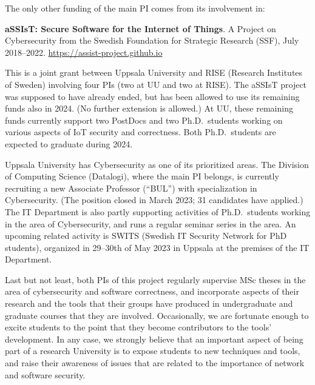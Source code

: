 \documentclass[11pt]{article}
\newcommand{\myparagraph}{}
\let\myparagraph=\paragraph
\renewcommand{\paragraph}{\vspace{-3mm}\myparagraph}
\begin{document}
\noindent
The only other funding of the main PI comes from its involvement in:
\vspace*{-.5em}
\begin{quoting}
  \textbf{aSSIsT: Secure Software for the Internet of Things}.
  A Project on Cybersecurity from the Swedish Foundation for Strategic
  Research (SSF), July 2018--2022. \url{https://assist-project.github.io}
\end{quoting}
\vspace*{-.5em}
%
This is a joint grant between Uppsala University and RISE (Research Institutes
of Sweden) involving four PIs (two at UU and two at RISE).  The aSSIsT project
was supposed to have already ended, but has been allowed to use its remaining
funds also in 2024. (No further extension is allowed.) At UU, these remaining
funds currently support two PostDocs and two Ph.D.\ students working on
various aspects of IoT security and correctness.  Both Ph.D.\ students are
expected to graduate during 2024.

Uppsala University has Cybersecurity as one of its prioritized areas.  The
Division of Computing Science (Datalogi), where the main PI belongs, is
currently recruiting a new Associate Professor (``BUL'') with specialization
in Cybersecurity. (The position closed in March 2023; 31 candidates have
applied.)  The IT Department is also partly supporting activities of
Ph.D.\ students working in the area of Cybersecurity, and runs a regular
seminar series in the area.  An upcoming related activity is SWITS (Swedish IT
Security Network for PhD students), organized in 29--30th of May 2023 in
Uppsala at the premises of the IT Department.

Last but not least, both PIs of this project regularly supervise MSc theses in
the area of cybersecurity and software correctness, and incorporate aspects of
their research and the tools that their groups have produced in undergraduate
and graduate courses that they are involved.  Occasionally, we are fortunate
enough to excite students to the point that they become contributors to the
tools' development. In any case, we strongly believe that an important aspect
of being part of a research University is to expose students to new techniques
and tools, and raise their awareness of issues that are related to the
importance of network and software security.




\end{document}
